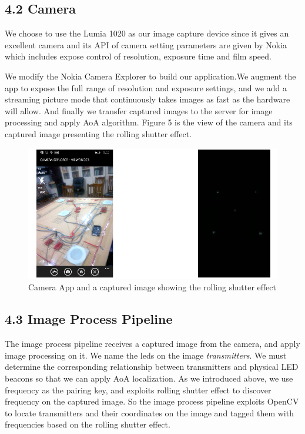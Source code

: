 \documentclass[a4paper, 11pt]{article} %
\begin{document}
\subsection*{4.2 Camera}
We choose to use the Lumia 1020 as our image capture device since it gives an excellent camera and its API of camera setting parameters are given by Nokia which includes expose control of resolution, exposure time and film speed.

We modify the Nokia Camera Explorer\cite{NCE} to build our application.We augment the app to expose the full range of resolution and exposure settings, and we add a streaming picture mode that continuously takes images as fast as the hardware will allow. And finally we transfer captured images to the server for image processing and apply AoA algorithm. Figure 5 is the view of the camera and its captured image presenting the rolling shutter effect.
\begin{figure}[h]
	\centering 
	\includegraphics[width=0.8\linewidth]{Figure5.png}
	\caption{Camera App and a captured image showing the rolling shutter effect}
	\label{fig:subfig}
\end{figure}

\subsection*{4.3 Image Process Pipeline}
The image process pipeline receives a captured image from the camera, and apply image processing on it. We name the leds on the image \textit{transmitters}. We must determine the corresponding relationship between transmitters and physical LED beacons so that we can apply AoA localization. As we introduced above, we use frequency as the pairing key, and exploits rolling shutter effect to discover frequency on the captured image. So the image process pipeline exploits OpenCV to locate transmitters and their coordinates on the image and tagged them with frequencies based on the rolling shutter effect.
\end{document}
